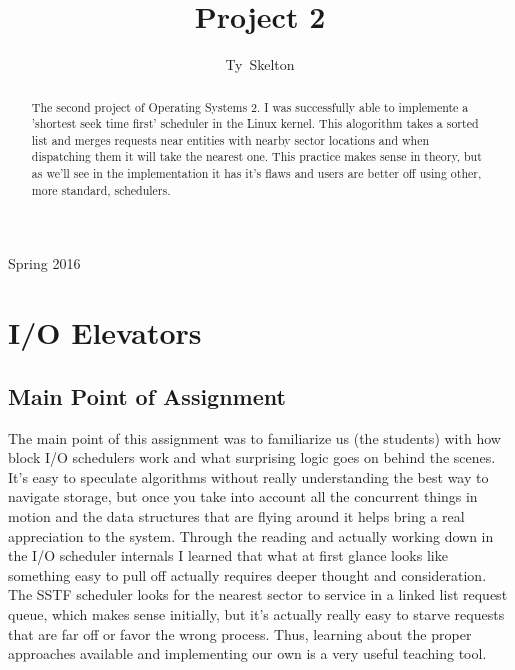 \documentclass[10pt,draftclsnofoot,onecolumn]{IEEEtran}
\begin{document}
\singlespacing
\title{Project 2}

\author{Ty~Skelton}


%
{Spring 2016}

\maketitle

\begin{abstract}
The second project of Operating Systems 2.
I was successfully able to implemente a 'shortest seek time first' scheduler in the Linux kernel.
This alogorithm takes a sorted list and merges requests near entities with nearby sector locations and when dispatching them it will take the nearest one.
This practice makes sense in theory, but as we'll see in the implementation it has it's flaws and users are better off using other, more standard, schedulers.


\end{abstract}
\IEEEpeerreviewmaketitle

\newpage
{}

\tableofcontents
\newpage


\section{I/O Elevators}
\subsection{Main Point of Assignment}
The main point of this assignment was to familiarize us (the students) with how block I/O schedulers work and what surprising logic goes on behind the scenes.
It's easy to speculate algorithms without really understanding the best way to navigate storage, but once you take into account all the concurrent things in motion and the data structures that are flying around it helps bring a real appreciation to the system.
Through the reading and actually working down in the I/O scheduler internals I learned that what at first glance looks like something easy to pull off actually requires deeper thought and consideration.
The SSTF scheduler looks for the nearest sector to service in a linked list request queue, which makes sense initially, but it's actually really easy to starve requests that are far off or favor the wrong process.
Thus, learning about the proper approaches available and implementing our own is a very useful teaching tool.
\end{document}
